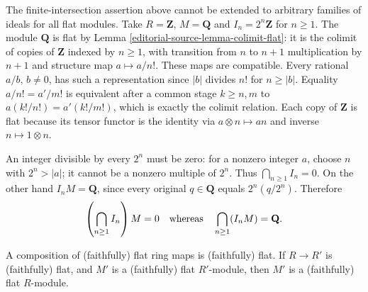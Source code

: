 \begin{example}
\label{editorial-source-example-flat-infinite-intersections}
The finite-intersection assertion above cannot be extended to
arbitrary families of ideals for all flat modules. Take
$R=\mathbf Z$, $M=\mathbf Q$ and $I_n=2^n\mathbf Z$ for
$n\geq1$. The module $\mathbf Q$ is flat by
Lemma \ref{editorial-source-lemma-colimit-flat}: it is the colimit of copies
of $\mathbf Z$ indexed by $n\geq1$, with transition from
$n$ to $n+1$ multiplication by $n+1$ and structure map
$a\mapsto a/n!$. These maps are compatible. Every rational
$a/b$, $b\ne0$, has such a representation since $|b|$ divides
$n!$ for $n\geq|b|$. Equality $a/n!=a'/m!$ is equivalent
after a common stage $k\geq n,m$ to
$a(k!/n!)=a'(k!/m!)$, which is exactly the colimit relation.
Each copy of $\mathbf Z$ is flat because its tensor functor
is the identity via $a\otimes n\mapsto an$ and inverse
$n\mapsto1\otimes n$.

An integer divisible by every $2^n$ must be zero: for a
nonzero integer $a$, choose $n$ with $2^n>|a|$; it cannot
be a nonzero multiple of $2^n$. Thus $\bigcap_{n\geq1}I_n=0$.
On the other hand $I_nM=\mathbf Q$, since every original
$q\in\mathbf Q$ equals $2^n(q/2^n)$. Therefore
$$
\left(\bigcap_{n\geq1}I_n\right)M=0
\quad\hbox{whereas}\quad
\bigcap_{n\geq1}(I_nM)=\mathbf Q.
$$
\end{example}

\begin{lemma}
\label{editorial-source-lemma-composition-flat}
A composition of (faithfully) flat ring maps is
(faithfully) flat.
If $R \to R'$ is (faithfully) flat, and $M'$ is a
(faithfully) flat $R'$-module, then $M'$ is a
(faithfully) flat $R$-module.
\end{lemma}

